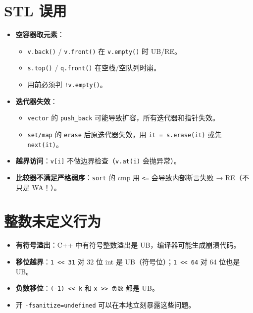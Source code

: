 \documentclass[UTF8,openany,oneside,zihao=-4]{ctexbook}
\begin{document}
\section{STL 误用}

\begin{warn}
\begin{itemize}
  \item \textbf{空容器取元素}：
    \begin{itemize}
      \item \lstinline|v.back()| / \lstinline|v.front()| 在 \lstinline|v.empty()| 时 UB/RE。
      \item \lstinline|s.top()| / \lstinline|q.front()| 在空栈/空队列时崩。
      \item 用前必须判 \lstinline|!v.empty()|。
    \end{itemize}
  \item \textbf{迭代器失效}：
    \begin{itemize}
      \item \lstinline|vector| 的 \lstinline|push_back| 可能导致扩容，所有迭代器和指针失效。
      \item \lstinline|set/map| 的 \lstinline|erase| 后原迭代器失效，用 \lstinline|it = s.erase(it)| 或先 \lstinline|next(it)|。
    \end{itemize}
  \item \textbf{越界访问}：\lstinline|v[i]| 不做边界检查（\lstinline|v.at(i)| 会抛异常）。
  \item \textbf{比较器不满足严格弱序}：\lstinline|sort| 的 cmp 用 \lstinline|<=| 会导致内部断言失败 → RE（不只是 WA！）。
\end{itemize}
\end{warn}

\section{整数未定义行为}

\begin{itemize}
  \item \textbf{有符号溢出}：C++ 中有符号整数溢出是 UB，编译器可能生成崩溃代码。
  \item \textbf{移位越界}：\lstinline|1 << 31| 对 32 位 int 是 UB（符号位）；\lstinline|1 << 64| 对 64 位也是 UB。
  \item \textbf{负数移位}：\lstinline|(-1) << k| 和 \lstinline|x >> 负数| 都是 UB。
  \item 开 \lstinline|-fsanitize=undefined| 可以在本地立刻暴露这些问题。
\end{itemize}
\end{document}

